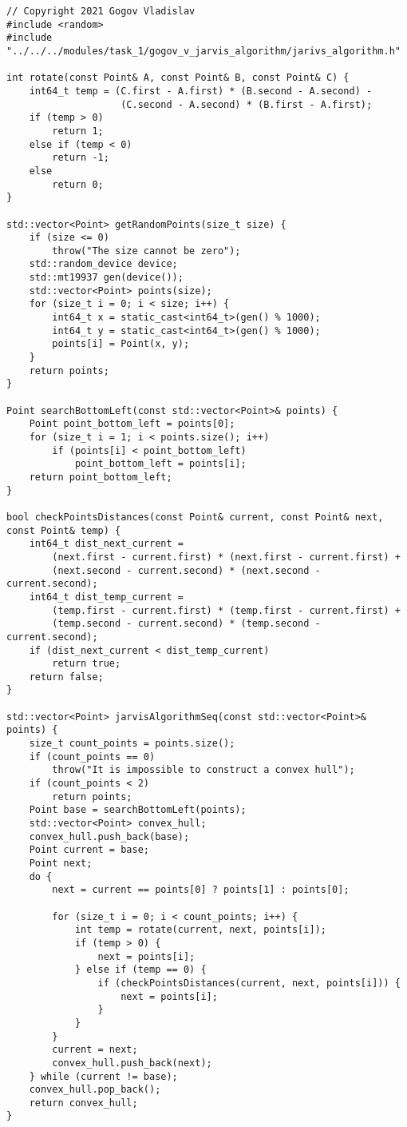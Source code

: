 \documentclass{report}
\begin{document}
\begin{lstlisting}
// Copyright 2021 Gogov Vladislav
#include <random>
#include "../../../modules/task_1/gogov_v_jarvis_algorithm/jarivs_algorithm.h"

int rotate(const Point& A, const Point& B, const Point& C) {
    int64_t temp = (C.first - A.first) * (B.second - A.second) -
                    (C.second - A.second) * (B.first - A.first);
    if (temp > 0)
        return 1;
    else if (temp < 0)
        return -1;
    else
        return 0;
}

std::vector<Point> getRandomPoints(size_t size) {
    if (size <= 0)
        throw("The size cannot be zero");
    std::random_device device;
    std::mt19937 gen(device());
    std::vector<Point> points(size);
    for (size_t i = 0; i < size; i++) {
        int64_t x = static_cast<int64_t>(gen() % 1000);
        int64_t y = static_cast<int64_t>(gen() % 1000);
        points[i] = Point(x, y);
    }
    return points;
}

Point searchBottomLeft(const std::vector<Point>& points) {
    Point point_bottom_left = points[0];
    for (size_t i = 1; i < points.size(); i++)
        if (points[i] < point_bottom_left)
            point_bottom_left = points[i];
    return point_bottom_left;
}

bool checkPointsDistances(const Point& current, const Point& next, const Point& temp) {
    int64_t dist_next_current =
        (next.first - current.first) * (next.first - current.first) +
        (next.second - current.second) * (next.second - current.second);
    int64_t dist_temp_current =
        (temp.first - current.first) * (temp.first - current.first) +
        (temp.second - current.second) * (temp.second - current.second);
    if (dist_next_current < dist_temp_current)
        return true;
    return false;
}

std::vector<Point> jarvisAlgorithmSeq(const std::vector<Point>& points) {
    size_t count_points = points.size();
    if (count_points == 0)
        throw("It is impossible to construct a convex hull");
    if (count_points < 2)
        return points;
    Point base = searchBottomLeft(points);
    std::vector<Point> convex_hull;
    convex_hull.push_back(base);
    Point current = base;
    Point next;
    do {
        next = current == points[0] ? points[1] : points[0];

        for (size_t i = 0; i < count_points; i++) {
            int temp = rotate(current, next, points[i]);
            if (temp > 0) {
                next = points[i];
            } else if (temp == 0) {
                if (checkPointsDistances(current, next, points[i])) {
                    next = points[i];
                }
            }
        }
        current = next;
        convex_hull.push_back(next);
    } while (current != base);
    convex_hull.pop_back();
    return convex_hull;
}
\end{lstlisting}
\end{document}
